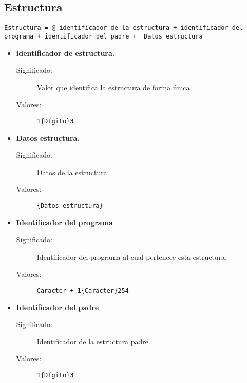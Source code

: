 \subsection{Estructura}\label{dd:Estructura}
\begin{lstlisting}
Estructura = @ identificador de la estructura + identificador del programa + identificador del padre +  Datos estructura
\end{lstlisting}
	\begin{itemize}
		\item \textbf{identificador de estructura.}
			\begin{description}
				\item [Significado:] Valor que identifica la estructura de forma única.
				\item [Valores:]{\begin{lstlisting}
1{Dígito}3\end{lstlisting}}\end{description}
		\item \textbf{Datos estructura.}\label{Datos_Estructura}
			\begin{description}
				\item [Significado:] Datos de la estructura.
				\item [Valores:]{\begin{lstlisting}
{Datos estructura}\end{lstlisting}}
			\end{description}
		\item \textbf{Identificador del programa}\label{Id_Porgrama}
			\begin{description}
				\item [Significado:] Identificador del programa al cual pertenece esta estructura. 
				\item [Valores:]{ 
				\begin{lstlisting}
Caracter + 1{Caracter}254\end{lstlisting}}%
			\end{description}
		\item \textbf{Identificador del padre}\label{Id_Padre}
			\begin{description}
			\item [Significado:] Identificador de la estructura padre. 
				\item [Valores:]{\begin{lstlisting}
1{Dígito}3\end{lstlisting}}
			\end{description}
	\end{itemize}

